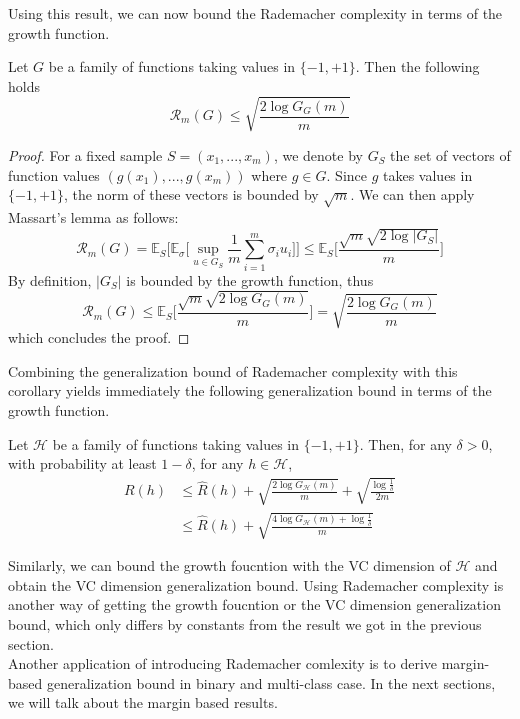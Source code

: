Using this result, we can now bound the Rademacher complexity in terms of the growth function.
\begin{corollary}
	Let $G$ be a family of functions taking values in $\{-1,+1\}$. Then the following holds
	\begin{equation}
	\mathcal{R}_m(G) \leq \sqrt{\frac{2\log G_G(m)}{m}}
	\end{equation}
\end{corollary}
\begin{proof}
	For a fixed sample $S=(x_1,...,x_m)$, we denote by $G_S$ the set of vectors of function values $(g(x_1),...,g(x_m))$ where $g \in G$. Since $g$ takes values in $\{-1,+1\}$, the norm of these vectors is bounded by $\sqrt{m}$. We can then apply Massart's lemma as follows:
	\begin{equation}
	\mathcal{R}_m(G)= \mathbb{E}_{S}\bigg[\mathbb{E}_{\sigma}\bigg[\sup_{u\in G_S}\frac{1}{m}\sum_{i=1}^{m}\sigma_iu_i\bigg]\bigg] \leq \mathbb{E}_{S}\bigg[\frac{\sqrt{m}\sqrt{2\log|G_S|}}{m} \bigg]
	\end{equation}
	By definition, $|G_S|$ is bounded by the growth function, thus
	\begin{equation}
	\mathcal{R}_m(G) \leq \mathbb{E}_{S}\bigg[\frac{\sqrt{m}\sqrt{2\log G_G(m)}}{m} \bigg] =\sqrt{ \frac{2\log G_G(m)}{m}}
	\end{equation}
	which concludes the proof.
\end{proof}
Combining the generalization bound of Rademacher complexity with this corollary yields immediately the following generalization bound in terms of the growth function.
\begin{corollary}
	Let $\mathcal{H}$ be a family of functions taking values in $\{-1,+1\}$. Then, for any $\delta >0$, with probability at least $1-\delta$, for any $h \in \mathcal{H}$,
	\begin{align}
	R(h)&\leq \hat{R}(h) + \sqrt{\frac{2\log G_{\mathcal{H}}(m)}{m}} +\sqrt{\frac{\log\frac{1}{\delta}}{2m}}\\
	&\leq \hat{R}(h) + \sqrt{\frac{4\log G_{\mathcal{H}}(m)+\log\frac{1}{\delta}}{m}}
	\end{align}
\end{corollary}
Similarly, we can bound the growth foucntion with the VC dimension of $\mathcal{H}$ and obtain the VC dimension generalization bound.
Using Rademacher complexity is another way of getting the growth foucntion or the VC dimension generalization bound, which only differs by constants from the result we got in the previous section.\\
Another application of introducing Rademacher comlexity is to derive margin-based generalization bound in binary and multi-class case. In the next sections, we will talk about the margin based results.

